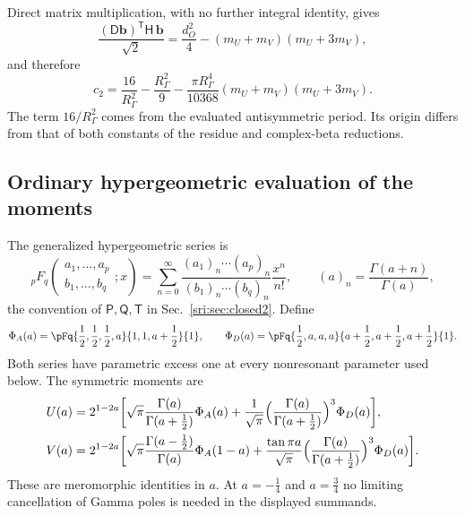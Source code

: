 Direct matrix multiplication, with no further integral identity, gives
\begin{equation}
 \frac{(\mathsf D\mathbf b)^{\mathsf T}\mathsf H\,\mathbf b}{\sqrt2}=\frac{d_O^2}{4}-(m_U+m_V)(m_U+3m_V),
\end{equation}
and therefore
\begin{equation}
 c_2=\frac{16}{R_\Gamma^2}-\frac{R_\Gamma^2}{9}-\frac{\pi R_\Gamma^4}{10368}(m_U+m_V)(m_U+3m_V).
 \label{sri:eq:cform:c2fg}
\end{equation}
The term $16/R_\Gamma^2$ comes from the evaluated antisymmetric period. Its origin differs from that of both constants
of the residue and complex-beta reductions.

\subsection{Ordinary hypergeometric evaluation of the moments}\label{sri:app:cform:hypergeometric}
The generalized hypergeometric series is~\cite{sri:NIST:DLMF}
\begin{equation}
 {}_pF_q\!\left(\begin{matrix}a_1,\ldots,a_p\\b_1,\ldots,b_q\end{matrix};x\right)
 =\sum_{n=0}^\infty\frac{(a_1)_n\cdots(a_p)_n}{(b_1)_n\cdots(b_q)_n}\frac{x^n}{n!},\qquad(a)_n=\frac{\Gamma(a+n)}{\Gamma(a)},
\end{equation}
the convention of $\mathsf P,\mathsf Q,\mathsf T$ in Sec.~\ref{sri:sec:closed2}. Define
\begin{equation}
 \Phi_A(a)=\pFq{\frac12,\frac12,\frac12,a}{1,1,a+\frac12}{1},\qquad
 \Phi_D(a)=\pFq{\frac12,a,a,a}{a+\frac12,a+\frac12,a+\frac12}{1}.
\end{equation}
Both series have parametric excess one at every nonresonant parameter used below. The symmetric moments are
\begin{align}
 U(a)&=2^{1-2a}\biggl[\sqrt\pi\frac{\Gamma(a)}{\Gamma(a+\frac12)}\Phi_A(a)
 +\frac1{\sqrt\pi}\Bigl(\frac{\Gamma(a)}{\Gamma(a+\frac12)}\Bigr)^3\Phi_D(a)\biggr],
 \label{sri:eq:cform:U}\\
 V(a)&=2^{1-2a}\biggl[\sqrt\pi\frac{\Gamma(a-\frac12)}{\Gamma(a)}\Phi_A(1-a)
 +\frac{\tan\pi a}{\sqrt\pi}\Bigl(\frac{\Gamma(a)}{\Gamma(a+\frac12)}\Bigr)^3\Phi_D(a)\biggr].
 \label{sri:eq:cform:V}
\end{align}
These are meromorphic identities in $a$. At $a=-\frac14$ and $a=\frac34$ no limiting cancellation of Gamma poles is
needed in the displayed summands.

